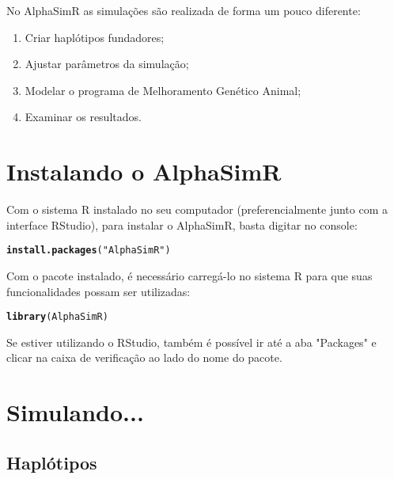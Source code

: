 \documentclass{article}\usepackage[]{graphicx}\usepackage[]{xcolor}
\makeatletter
\newcommand{\hlstr}[1]{\textcolor[rgb]{0.192,0.494,0.8}{#1}}%
\newcommand{\hlstd}[1]{\textcolor[rgb]{0.345,0.345,0.345}{#1}}%
\newcommand{\hlkwd}[1]{\textcolor[rgb]{0.737,0.353,0.396}{\textbf{#1}}}%
\newenvironment{kframe}{%
 \def\at@end@of@kframe{}%
 \ifinner\ifhmode%
  \def\at@end@of@kframe{\end{minipage}}%
  \begin{minipage}{\columnwidth}%
 \fi\fi%
 \def\FrameCommand##1{\hskip\@totalleftmargin \hskip-\fboxsep
 \colorbox{shadecolor}{##1}\hskip-\fboxsep
     \hskip-\linewidth \hskip-\@totalleftmargin \hskip\columnwidth}%
 \MakeFramed {\advance\hsize-\width
   \@totalleftmargin\z@ \linewidth\hsize
   \@setminipage}}%
 {\par\unskip\endMakeFramed%
 \at@end@of@kframe}
\newenvironment{knitrout}{}{} %
\makeatother
\begin{document}
No AlphaSimR as simulações são realizada de forma um pouco diferente:

\begin{enumerate}
\item\label{passo1} Criar haplótipos fundadores;
\item Ajustar parâmetros da simulação;
\item Modelar o programa de Melhoramento Genético Animal;
\item Examinar os resultados.
\end{enumerate}

\section{Instalando o AlphaSimR}

Com o sistema R instalado no seu computador (preferencialmente junto com a interface RStudio), para instalar o AlphaSimR, basta digitar no console: 
\begin{knitrout}
\color{fgcolor}\begin{kframe}
\begin{alltt}
\hlkwd{install.packages}\hlstd{(}\hlstr{"AlphaSimR"}\hlstd{)}
\end{alltt}
\end{kframe}
\end{knitrout}

Com o pacote instalado, é necessário carregá-lo no sistema R para que suas funcionalidades possam ser utilizadas:
\begin{knitrout}
\color{fgcolor}\begin{kframe}
\begin{alltt}
\hlkwd{library}\hlstd{(AlphaSimR)}
\end{alltt}
\end{kframe}
\end{knitrout}

Se estiver utilizando o RStudio, também é possível ir até a aba "Packages" e clicar na caixa de verificação ao lado do nome do pacote.

\section{Simulando...}

\subsection{Haplótipos}
\end{document}
